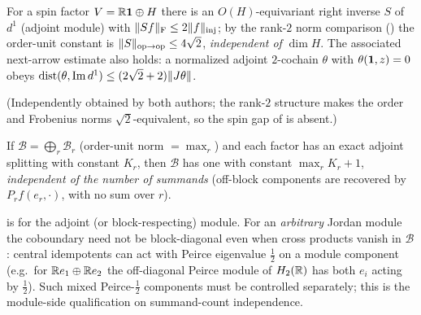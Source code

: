 \begin{proposition}\label{prop:spin-splitting}
For a spin factor $V=\mathbb{R}\mathbf{1}\oplus H$ there is an $O(H)$-equivariant right inverse
$S$ of $d^1$ (adjoint module) with
$\lVert Sf \rVert_{\mathrm F}\le2\lVert f \rVert_{\mathrm{inj}}$;
by the rank-$2$ norm comparison () the order-unit constant is
$\lVert S \rVert_{\mathrm{op}\to\mathrm{op}}\le4\sqrt2$, \emph{independent of}
$\dim H$. The associated next-arrow estimate also holds: a normalized adjoint
$2$-cochain $\theta$ with $\theta(\mathbf{1},z)=0$ obeys
$\operatorname{dist}(\theta,\operatorname{Im} d^1)\le(2\sqrt2+2)\lVert J\theta \rVert$.
\end{proposition}

\noindent (Independently obtained by both authors; the rank-$2$ structure makes
the order and Frobenius norms $\sqrt2$-equivalent, so the spin gap of
 is absent.)

\begin{proposition}\label{prop:direct-sum}
If $\mathcal B=\bigoplus_{r}\mathcal B_r$ (order-unit norm $=\max_r$) and each
factor has an exact adjoint splitting with constant $K_r$, then $\mathcal B$ has
one with constant $\max_r K_r+1$, \emph{independent of the number of summands}
(off-block components are recovered by $P_r f(e_r,\cdot)$, with no sum over $r$).
\end{proposition}

\begin{remark}\label{rem:directsum-scope}
 is for the adjoint (or block-respecting) module. For an
\emph{arbitrary} Jordan module the coboundary need not be block-diagonal even
when cross products vanish in $\mathcal B$: central idempotents can act with
Peirce eigenvalue $\tfrac12$ on a module component (e.g.\ for $\mathbb{R} e_1\oplus\mathbb{R} e_2$
the off-diagonal Peirce module of $H_2(\mathbb{R})$ has both $e_i$ acting by $\tfrac12$).
Such mixed Peirce-$\tfrac12$ components must be controlled separately; this is
the module-side qualification on summand-count independence.
\end{remark}

